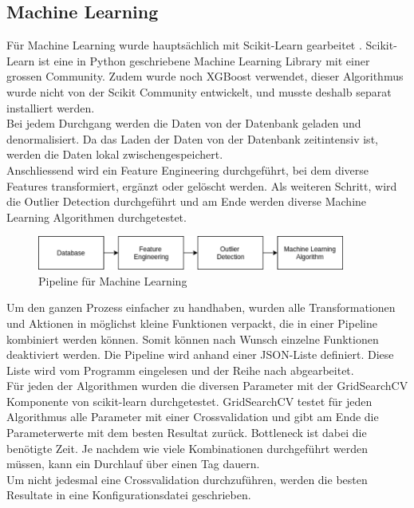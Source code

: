\subsection{Machine Learning}
Für Machine Learning wurde hauptsächlich mit Scikit-Learn gearbeitet \cite{scikit}. Scikit-Learn ist eine in Python geschriebene Machine Learning Library mit einer grossen Community. Zudem wurde noch XGBoost verwendet, dieser Algorithmus wurde nicht von der Scikit Community entwickelt, und musste deshalb separat installiert werden. \\[2ex]
%
Bei jedem Durchgang werden die Daten von der Datenbank geladen und denormalisiert. Da das Laden der Daten von der Datenbank zeitintensiv ist, werden die Daten lokal zwischengespeichert.\\
Anschliessend wird ein Feature Engineering durchgeführt, bei dem diverse Features transformiert, ergänzt oder gelöscht werden. Als weiteren Schritt, wird die Outlier Detection durchgeführt und am Ende werden diverse Machine Learning Algorithmen durchgetestet.

\begin{figure}[h]
\centering
\includegraphics[width=0.9\textwidth]{images/machine_learning_pipeline.png}
\caption[Pipeline für Machine Learning]{Pipeline für Machine Learning}%
\label{fig:ml_pipeline}
\end{figure}

Um den ganzen Prozess einfacher zu handhaben, wurden alle Transformationen und Aktionen in möglichst kleine Funktionen verpackt, die in einer Pipeline kombiniert werden können. Somit können nach Wunsch einzelne Funktionen deaktiviert werden. Die Pipeline wird anhand einer JSON-Liste definiert. Diese Liste wird vom Programm eingelesen und der Reihe nach abgearbeitet.\\[2ex]
%
Für jeden der Algorithmen wurden die diversen Parameter mit der GridSearchCV Komponente von scikit-learn durchgetestet. GridSearchCV testet für jeden Algorithmus alle Parameter mit einer Crossvalidation und gibt am Ende die Parameterwerte mit dem besten Resultat zurück. Bottleneck ist dabei die benötigte Zeit. Je nachdem wie viele Kombinationen durchgeführt werden müssen, kann ein Durchlauf über einen Tag dauern.\\
Um nicht jedesmal eine Crossvalidation durchzuführen, werden die besten Resultate in eine Konfigurationsdatei geschrieben.

